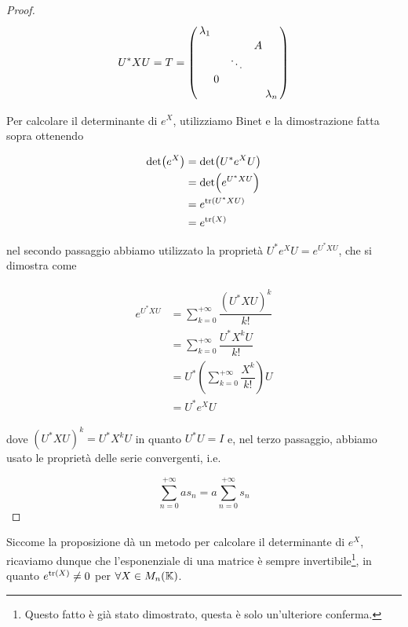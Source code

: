 \begin{proof}
	\begin{equation}
		U^{*} X U = T = %
		\smqty(\dmat{ \lambda_{1}, %
			& & A \\ %
			& \ddots & \\ %
			0 & & , %
			\lambda_{n} })
	\end{equation}
	
	Per calcolare il determinante di $ e^{X} $, utilizziamo Binet e la dimostrazione fatta sopra ottenendo
	
	\begin{align}
		\begin{split}
			\det(e^{X}) &= \det(U^{*} e^{X} U)\\
			&= \det(e^{U^{*} X U})\\
			&= e^{\tr(U^{*} X U)}\\
			&= e^{\tr(X)}
		\end{split}
	\end{align}
	
	nel secondo passaggio abbiamo utilizzato la proprietà $ U^{*} e^{X} U = e^{U^{*} X U} $, che si dimostra come
	
	\begin{align}
		\begin{split}
			e^{U^{*} X U} &= \sum_{k=0}^{+\infty} \dfrac{(U^{*} X U)^{k}}{k!}\\
			&= \sum_{k=0}^{+\infty} \dfrac{U^{*} X^{k} U}{k!}\\
			&= U^{*} \left( \sum_{k=0}^{+\infty} \dfrac{X^{k}}{k!} \right) U\\
			&= U^{*} e^{X} U
		\end{split}
	\end{align}

	dove $ (U^{*} X U)^{k} = U^{*} X^{k} U $ in quanto $ U^{*} U = I $ e, nel terzo passaggio, abbiamo usato le proprietà delle serie convergenti, i.e.
	
	\begin{equation}
		\sum_{n=0}^{+\infty} a s_{n} = a \sum_{n=0}^{+\infty} s_{n}
	\end{equation}
\end{proof}

\begin{corollary}
	Siccome la proposizione dà un metodo per calcolare il determinante di $ e^{X} $, ricaviamo dunque che l'esponenziale di una matrice è sempre invertibile\footnote{%
		Questo fatto è già stato dimostrato, questa è solo un'ulteriore conferma.%
	}, in quanto $ e^{\tr(X)} \neq 0 $ per $ \forall X \in M_{n}(\mathbb{K}) $.
\end{corollary}

